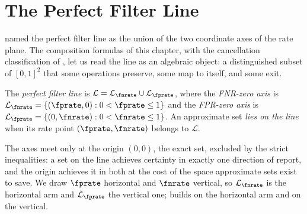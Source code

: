 %

\section{The Perfect Filter Line}
\label{sec:perfect-filter-line}

 named the perfect filter line as the union of
the two coordinate axes of the rate plane. The composition formulas of this
chapter, with the cancellation classification of , let
us read the line as an algebraic object: a distinguished subset of $[0,1]^2$
that some operations preserve, some map to itself, and some exit.

\begin{definition}
\label{def:perfect-filter-line}
The \emph{perfect filter line} is
$\mathcal{L} = \mathcal{L}_{\fnrate} \cup \mathcal{L}_{\fprate}$, where the
\emph{FNR-zero axis} is $\mathcal{L}_{\fnrate} = \{(\fprate, 0) : 0 < \fprate
\le 1\}$ and the \emph{FPR-zero axis} is $\mathcal{L}_{\fprate} = \{(0,
\fnrate) : 0 < \fnrate \le 1\}$. An approximate set \emph{lies on the line}
when its rate point $(\fprate, \fnrate)$ belongs to $\mathcal{L}$.
\end{definition}

The axes meet only at the origin $(0,0)$, the exact set, excluded by the
strict inequalities: a set on the line achieves certainty in exactly one
direction of report, and the origin achieves it in both at the cost of the
space approximate sets exist to save. We draw $\fprate$ horizontal and
$\fnrate$ vertical, so $\mathcal{L}_{\fnrate}$ is the horizontal arm and
$\mathcal{L}_{\fprate}$ the vertical one; 
builds on the horizontal arm and  on the
vertical.

